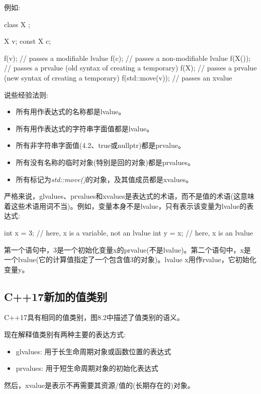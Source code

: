 例如:

\begin{cppcode}
class X {
};

X v;
const X c;

f(v); // passes a modifiable lvalue
f(c); // passes a non-modifiable lvalue
f(X()); // passes a prvalue (old syntax of creating a temporary)
f(X{}); // passes a prvalue (new syntax of creating a temporary)
f(std::move(v)); // passes an xvalue
\end{cppcode}

说些经验法则:

\begin{itemize}
	\item 所有用作表达式的名称都是lvalue。
	\item 所有用作表达式的字符串字面值都是lvalue。
	\item 所有非字符串字面值(4.2、true或nullptr)都是prvalue。
	\item 所有没有名称的临时对象(特别是回的对象)都是prvalues。
	\item 所有标记为\textit{std::move()}的对象，及其值成员都是xvalues。
\end{itemize}

严格来说，glvalues、prvalues和xvalues是表达式的术语，而不是值的术语(这意味着这些术语用词不当)。例如，变量本身不是lvalue，只有表示该变量为lvalue的表达式:

\begin{cppcode}
int x = 3; // here, x is a variable, not an lvalue
int y = x; // here, x is an lvalue
\end{cppcode}

第一个语句中，3是一个初始化变量x的prvalue(不是lvalue)。第二个语句中，x是一个lvalue(它的计算值指定了一个包含值3的对象)。lvalue x用作rvalue，它初始化变量y。

\subsection{C++17新加的值类别}

C++17具有相同的值类别，图8.2中描述了值类别的语义。

现在解释值类别有两种主要的表达方式:

\begin{itemize}
	\item glvalues: 用于长生命周期对象或函数位置的表达式
	\item prvalues: 用于短生命周期对象的初始化表达式
\end{itemize}

然后，xvalue是表示不再需要其资源/值的(长期存在的)对象。

